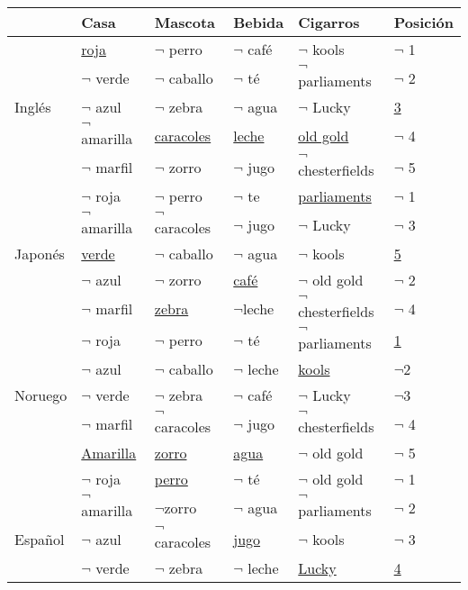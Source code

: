 \documentclass[spanish,12pt,letterpaper]{article}
\begin{document}
\begin{table}[htbp]
  \begin{center}
    \begin{tabular}{|l|l|l|l|l|l|}
      \hline
      & Casa & Mascota & Bebida & Cigarros & Posición \\ \hline
      & \underline{roja} &$\neg$ perro &$\neg$ café &$\neg$ kools &$\neg$ 1\\ 
      &$\neg$ verde &$\neg$ caballo &$\neg$ té &$\neg$ parliaments &$\neg$ 2\\ 
      Inglés    &$\neg$ azul &$\neg$ zebra &$\neg$ agua &$\neg$ Lucky &\underline{3} \\
      &$\neg$ amarilla &\underline{caracoles} &\underline{leche} &\underline{old gold} &$\neg$ 4 \\ 
      &$\neg$ marfil &$\neg$ zorro &$\neg$ jugo &$\neg$ chesterfields &$\neg$ 5 \\ \hline
      &$\neg$ roja &$\neg$ perro &$\neg$ te & \underline{parliaments} &$\neg$ 1 \\
      &$\neg$ amarilla &$\neg$ caracoles &$\neg$ jugo &$\neg$ Lucky &$\neg$ 3 \\ 
      Japonés   &\underline{verde} &$\neg$ caballo &$\neg$ agua &$\neg$ kools &\underline{5} \\
      &$\neg$ azul &$\neg$ zorro &\underline{café} &$\neg$ old gold&$\neg$ 2\\
      &$\neg$ marfil &\underline{zebra} &$\neg$leche &$\neg$ chesterfields &$\neg$ 4\\ \hline
      &$\neg$ roja &$\neg$ perro &$\neg$ té &$\neg$ parliaments &\underline{1}\\
      &$\neg$ azul&$\neg$ caballo &$\neg$ leche &\underline{kools} &$\neg$2\\
      Noruego   &$\neg$ verde &$\neg$ zebra &$\neg$ café &$\neg$ Lucky &$\neg$3\\
      &$\neg$ marfil &$\neg$ caracoles &$\neg$ jugo &$\neg$ chesterfields &$\neg$ 4\\
      &\underline{Amarilla} &\underline{zorro} &\underline{agua} &$\neg$ old gold &$\neg$ 5\\\hline
      &$\neg$ roja &\underline{perro} &$\neg$ té &$\neg$ old gold &$\neg$ 1\\
      &$\neg$ amarilla &$\neg$zorro &$\neg$ agua &$\neg$ parliaments &$\neg$ 2\\
      Español   &$\neg$ azul &$\neg$ caracoles &\underline{jugo} &$\neg$ kools &$\neg$ 3\\
      &$\neg$ verde &$\neg$ zebra &$\neg$ leche &\underline{Lucky} &\underline{4}\\

\end{tabular}
\end{center}
\end{table}
\end{document}
